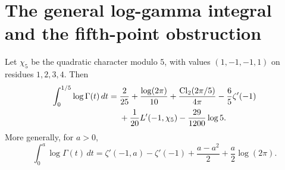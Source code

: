\section{The general log-gamma integral and the fifth-point obstruction}
\begin{proposition}
\label{loggamma:corr:loggamma-five}
Let $\chi_5$ be the quadratic character modulo $5$, with values
$(1,-1,-1,1)$ on residues $1,2,3,4$.  Then
\begin{align}
 \int_0^{1/5}\log\Gamma(t)\,dt
 ={}&\frac{2}{25}+\frac{\log(2\pi)}{10}
       +\frac{\operatorname{Cl}_2(2\pi/5)}{4\pi}
       -\frac65\zeta'(-1) \notag\\
    &+\frac1{20}L'(-1,\chi_5)-\frac{29}{1200}\log5.
 \label{loggamma:corr:loggamma-five-formula}
\end{align}
More generally, for $a>0$,
\begin{equation}\label{loggamma:corr:loggamma-general}
 \int_0^a\log\Gamma(t)\,dt
 =\zeta'(-1,a)-\zeta'(-1)
       +\frac{a-a^2}{2}+\frac a2\log(2\pi).
\end{equation}
\end{proposition}
